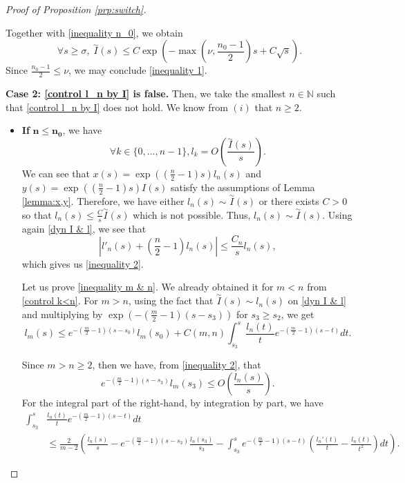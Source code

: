 \documentclass[11pt,a4paper]{article}
\newcommand{\1}{\mathbbm{1}}
\numberwithin{equation}{section}
\newcommand{\numberset}{\mathbb}
\newcommand{\N}{\numberset{N}}
\theoremstyle{remark}
\begin{document}
\begin{proof}[Proof of Proposition \ref{prp:switch}]
\begin{enumerate}[label=(\roman*)]
Together with \ref{inequality n_0}, we obtain
\begin{equation*}
\forall s\geq \sigma,\ \overset{\sim}{I}(s)\leq C \exp\left(-\max\left(\nu,\frac{n_0-1}{2}\right)s+C\sqrt{s}\right).
\end{equation*}
Since $\frac{n_0-1}{2}\leq \nu$, we may conclude \eqref{inequality 1}.


\textbf{Case 2: \eqref{control l_n by I} is false.} Then, we take the smallest $n\in \N$ such that \eqref{control l_n by I} does not hold. We know from $(i)$ that $n\geq 2$.

\begin{itemize}
\item \textbf{If} $\mathbf{n\leq n_0}$, we have
\begin{equation}\label{control k<n}
\forall k\in \{0,...,n-1\}, l_k=O\left(\frac{\overset{\sim}{I}(s)}{s}\right).
\end{equation}
We can see that $x(s)=\exp((\frac{n}{2}-1)s)l_n(s)$ and $y(s)=\exp((\frac{n}{2}-1)s)I(s)$ satisfy the assumptions of Lemma \ref{lemma:x,y}. Therefore, we have either $l_n(s)\sim \overset{\sim}{I}(s)$ or there exists $C>0$ so that $l_n(s)\le \frac{C}{s}\overset{\sim}{I}(s)$ which is not possible. Thus, $l_n(s)\sim \overset{\sim}{I}(s)$. Using again \eqref{dyn I & l}, we see that
\begin{equation}\label{edo l_n}
\left|l'_n(s)+\left(\frac{n}{2}-1\right)l_n(s)\right|\leq \frac{C_n}{s}l_n(s),
\end{equation}
which gives us \eqref{inequality 2}.



Let us prove \eqref{inequality m & n}. We already obtained it for $m<n$ from \eqref{control k<n}. For $m>n$, using the fact that $\overset{\sim}{I}(s)\sim l_n(s)$ on \eqref{dyn I & l}
and multiplying by $\exp(-(\frac{m}{2}-1)(s-s_3))$ for $s_3\geq s_2$, we get
\begin{equation}\label{control expression l_m}
l_m(s)\leq e^{-(\frac{m}{2}-1)(s-s_0)}l_m(s_0)+C(m,n)\int_{s_3}^s\frac{l_n(t)}{t}e^{-(\frac{m}{2}-1)(s-t)} dt.
\end{equation}

Since $m>n\geq 2$, then  we have, from \eqref{inequality 2}, that
\begin{equation}\label{inequality exp}
e^{-(\frac{m}{2}-1)(s-s_3)}l_m(s_3)\leq O\left(\frac{l_n(s)}{s}\right).
\end{equation}
For the integral part of the right-hand, by integration by part, we have
\begin{equation}\label{ipp}
\begin{aligned}
\int_{s_3}^s&\frac{l_n(t)}{t}e^{-(\frac{m}{2}-1)(s-t)} d t\\
&\leq   \frac{2}{m-2}\left(\frac{l_n(s)}{s} -e^{-(\frac{m}{2}-1)(s-s_3)}\frac{l_n(s_3)}{s_3}-\int^s_{s_3}e^{-(\frac{m}{2}-1)(s-t)}\left(\frac{l_n'(t)}{t}-\frac{l_n(t)}{t^2}\right)d t\right).
\end{aligned}
\end{equation}


\end{itemize}
\end{enumerate}
\end{proof}
\end{document}
